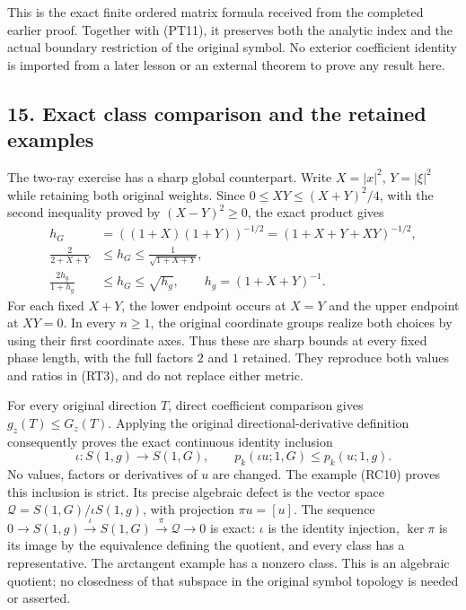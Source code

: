 \documentclass[
  11pt,
]{article}
\begin{document}
This is the exact finite ordered matrix formula received from the
completed earlier proof. Together with (PT11), it preserves both the
analytic index and the actual boundary restriction of the original
symbol. No exterior coefficient identity is imported from a later lesson
or an external theorem to prove any result here.

\subsection{15. Exact class comparison and the retained
examples}\label{exact-class-comparison-and-the-retained-examples}

The two-ray exercise has a sharp global counterpart. Write \(X=|x|^2\),
\(Y=|\xi|^2\) while retaining both original weights. Since
\(0\leq XY\leq(X+Y)^2/4\), with the second inequality proved by
\((X-Y)^2\geq0\), the exact product gives \[
 \begin{split}
 h_G&=((1+X)(1+Y))^{-1/2}
       =(1+X+Y+XY)^{-1/2},\\
 \frac{2}{2+X+Y}&\leq h_G\leq\frac1{\sqrt{1+X+Y}},\\
 \frac{2h_g}{1+h_g}&\leq h_G\leq\sqrt{h_g},
          \qquad h_g=(1+X+Y)^{-1}.
 \end{split}
 \tag{RS30}
\] For each fixed \(X+Y\), the lower endpoint occurs at \(X=Y\) and the
upper endpoint at \(XY=0\). In every \(n\geq1\), the original coordinate
groups realize both choices by using their first coordinate axes. Thus
these are sharp bounds at every fixed phase length, with the full
factors \(2\) and \(1\) retained. They reproduce both values and ratios
in (RT3), and do not replace either metric.

For every original direction \(T\), direct coefficient comparison gives
\(g_z(T)\leq G_z(T)\). Applying the original directional-derivative
definition consequently proves the exact continuous identity inclusion
\[
 \iota:S(1,g)\longrightarrow S(1,G),\qquad
       p_k(\iota u;1,G)\leq p_k(u;1,g).
 \tag{RS31}
\] No values, factors or derivatives of \(u\) are changed. The example
(RC10) proves this inclusion is strict. Its precise algebraic defect is
the vector space \(\mathcal Q=S(1,G)/\iota S(1,g)\), with projection
\(\pi u=[u]\). The sequence
\(0\longrightarrow S(1,g)\xrightarrow{\iota}S(1,G)
\xrightarrow{\pi}\mathcal Q\longrightarrow0\) is exact: \(\iota\) is the
identity injection, \(\ker\pi\) is its image by the equivalence defining
the quotient, and every class has a representative. The arctangent
example has a nonzero class. This is an algebraic quotient; no
closedness of that subspace in the original symbol topology is needed or
asserted.
\end{document}

